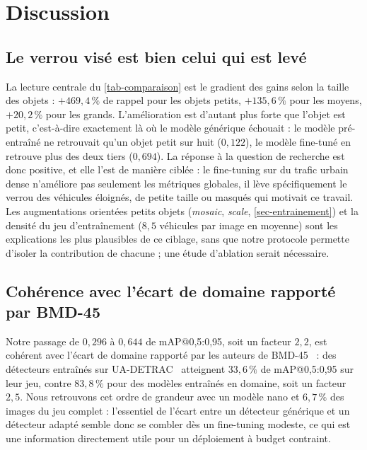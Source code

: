 \section{Discussion}\label{sec-discussion}

\subsection{Le verrou visé est bien celui qui est levé}

La lecture centrale du \cref{tab-comparaison} est le gradient des gains
selon la taille des objets : $+469{,}4\,\%$ de rappel pour les objets
petits, $+135{,}6\,\%$ pour les moyens, $+20{,}2\,\%$ pour les grands.
L'amélioration est d'autant plus forte que l'objet est petit, c'est-à-dire
exactement là où le modèle générique échouait : le modèle pré-entraîné ne
retrouvait qu'un objet petit sur huit ($0{,}122$), le modèle fine-tuné en
retrouve plus des deux tiers ($0{,}694$). La réponse à la question de
recherche est donc positive, et elle l'est de manière ciblée : le
fine-tuning sur du trafic urbain dense n'améliore pas seulement les
métriques globales, il lève spécifiquement le verrou des véhicules
éloignés, de petite taille ou masqués qui motivait ce travail. Les
augmentations orientées petits objets (\emph{mosaic}, \emph{scale},
\cref{sec-entrainement}) et la densité du jeu d'entraînement
($8{,}5$ véhicules par image en moyenne) sont les explications les plus
plausibles de ce ciblage, sans que notre protocole permette d'isoler la
contribution de chacune ; une étude d'ablation serait nécessaire.

\subsection{Cohérence avec l'écart de domaine rapporté par BMD-45}

Notre passage de $0{,}296$ à $0{,}644$ de mAP@0,5:0,95, soit un facteur
$2{,}2$, est cohérent avec l'écart de domaine rapporté par les auteurs de
BMD-45~\cite{sharma2026bmd45} : des détecteurs entraînés sur
UA-DETRAC~\cite{wen2020uadetrac} atteignent $33{,}6\,\%$ de mAP@0,5:0,95
sur leur jeu, contre $83{,}8\,\%$ pour des modèles entraînés en domaine,
soit un facteur $2{,}5$. Nous retrouvons cet ordre de grandeur avec un
modèle nano et $6{,}7\,\%$ des images du jeu complet : l'essentiel de
l'écart entre un détecteur générique et un détecteur adapté semble donc
se combler dès un fine-tuning modeste, ce qui est une information
directement utile pour un déploiement à budget contraint.

